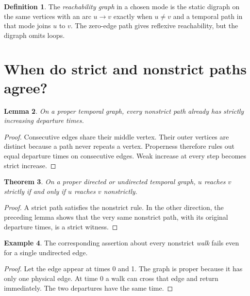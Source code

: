 \documentclass[11pt]{article}
\newtheorem{theorem}{Theorem}
\newtheorem{lemma}[theorem]{Lemma}
\theoremstyle{definition}
\newtheorem{definition}[theorem]{Definition}
\newtheorem{example}[theorem]{Example}
\begin{document}
\begin{definition}
The \emph{reachability graph} in a chosen mode is the static digraph on the
same vertices with an arc $u\to v$ exactly when $u\ne v$ and a temporal path
in that mode joins $u$ to $v$. The zero-edge path gives reflexive reachability,
but the digraph omits loops.
\end{definition}
\newpage
\section{When do strict and nonstrict paths agree?}

\begin{lemma}
On a proper temporal graph, every nonstrict path already has strictly
increasing departure times.
\end{lemma}

\begin{proof}
Consecutive edges share their middle vertex. Their outer vertices are distinct because a path never repeats a vertex. Properness therefore
rules out equal departure times on consecutive edges. Weak increase at
every step becomes strict increase.
\end{proof}

\begin{theorem}
On a proper directed or undirected temporal graph, $u$ reaches $v$ strictly
if and only if $u$ reaches $v$ nonstrictly.
\end{theorem}

\begin{proof}
A strict path satisfies the nonstrict rule. In the other direction, the
preceding lemma shows that the very same nonstrict path, with its original
departure times, is a strict witness.
\end{proof}

\begin{example}
The corresponding assertion about every nonstrict \emph{walk} fails even
for a single undirected edge.
\end{example}

\begin{proof}
Let the edge appear at times 0 and 1. The graph is proper because it has
only one physical edge. At time 0 a walk can cross that edge and return
immediately. The two departures have the same time.
\end{proof}
\end{document}
